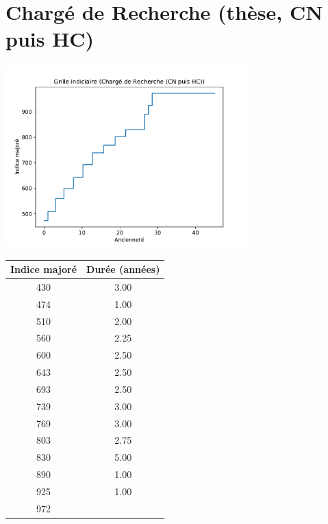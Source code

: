 \newpage 
 
\chapter{Chargé de Recherche (thèse, CN puis HC)} 

\begin{minipage}{0.55\linewidth}\includegraphics[width=0.7\textwidth]{fig/grille_CR.pdf}\end{minipage} 
\begin{minipage}{0.3\linewidth} 
 \begin{center} 

\begin{tabular}[htb]{|c|c|} 
\hline 
 Indice majoré &  Durée (années) \\ 
\hline \hline 
 430 &  3.00 \\ 
\hline 
 474 &  1.00 \\ 
\hline 
 510 &  2.00 \\ 
\hline 
 560 &  2.25 \\ 
\hline 
 600 &  2.50 \\ 
\hline 
 643 &  2.50 \\ 
\hline 
 693 &  2.50 \\ 
\hline 
 739 &  3.00 \\ 
\hline 
 769 &  3.00 \\ 
\hline 
 803 &  2.75 \\ 
\hline 
 830 &  5.00 \\ 
\hline 
 890 &  1.00 \\ 
\hline 
 925 &  1.00 \\ 
\hline 
 972 &   \\ 
\hline 
\hline 
\end{tabular} 
\end{center} 
 \end{minipage} 


